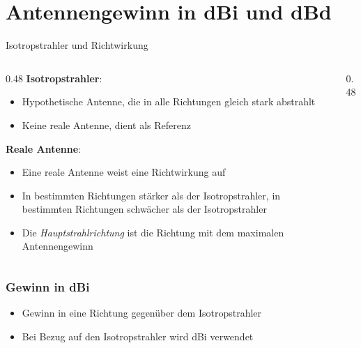 \section{Antennengewinn in dBi und dBd}
\label{section:antennengewinn}
\begin{frame}{Isotropstrahler und Richtwirkung}
    \begin{columns}
        \begin{column}{0.48\linewidth}
            \textbf{Isotropstrahler}: 
            \begin{itemize}
                \item Hypothetische Antenne, die in alle Richtungen gleich stark abstrahlt
                \item Keine reale Antenne, dient als Referenz
            \end{itemize}
            \textbf{Reale Antenne}: 
            \begin{itemize}
                \item Eine reale Antenne weist eine Richtwirkung auf
                \item In bestimmten Richtungen stärker als der Isotropstrahler, in bestimmten Richtungen schwächer als der Isotropstrahler
                \item Die \emph{Hauptstrahlrichtung} ist die Richtung mit dem maximalen Antennengewinn
            \end{itemize}
        \end{column}
        \begin{column}{0.48\linewidth}
        \end{column}
    \end{columns}
\end{frame}

\begin{frame}
    \frametitle{Gewinn in dBi}
    \begin{itemize}
        \item Gewinn in eine Richtung gegenüber dem Isotropstrahler
        \item Bei Bezug auf den Isotropstrahler wird \textcolor{DARCblue}{dBi} verwendet
    \end{itemize}
\end{frame}

